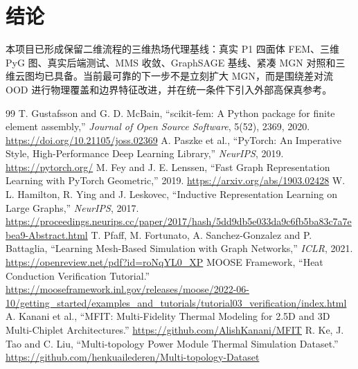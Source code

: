 \documentclass[11pt,a4paper]{article}
\begin{document}
\section{结论}
本项目已形成保留二维流程的三维热场代理基线：真实 P1 四面体 FEM、三维 PyG 图、真实后端测试、MMS 收敛、GraphSAGE 基线、紧凑 MGN 对照和三维云图均已具备。当前最可靠的下一步不是立刻扩大 MGN，而是围绕差对流 OOD 进行物理覆盖和边界特征改进，并在统一条件下引入外部高保真参考。

\begin{thebibliography}{99}
 T. Gustafsson and G. D. McBain, ``scikit-fem: A Python package for finite element assembly,'' \emph{Journal of Open Source Software}, 5(52), 2369, 2020. \url{https://doi.org/10.21105/joss.02369}
 A. Paszke et al., ``PyTorch: An Imperative Style, High-Performance Deep Learning Library,'' \emph{NeurIPS}, 2019. \url{https://pytorch.org/}
 M. Fey and J. E. Lenssen, ``Fast Graph Representation Learning with PyTorch Geometric,'' 2019. \url{https://arxiv.org/abs/1903.02428}
 W. L. Hamilton, R. Ying and J. Leskovec, ``Inductive Representation Learning on Large Graphs,'' \emph{NeurIPS}, 2017. \url{https://proceedings.neurips.cc/paper/2017/hash/5dd9db5e033da9c6fb5ba83c7a7ebea9-Abstract.html}
 T. Pfaff, M. Fortunato, A. Sanchez-Gonzalez and P. Battaglia, ``Learning Mesh-Based Simulation with Graph Networks,'' \emph{ICLR}, 2021. \url{https://openreview.net/pdf?id=roNqYL0_XP}
 MOOSE Framework, ``Heat Conduction Verification Tutorial.'' \url{https://mooseframework.inl.gov/releases/moose/2022-06-10/getting_started/examples_and_tutorials/tutorial03_verification/index.html}
 A. Kanani et al., ``MFIT: Multi-Fidelity Thermal Modeling for 2.5D and 3D Multi-Chiplet Architectures.'' \url{https://github.com/AlishKanani/MFIT}
 R. Ke, J. Tao and C. Liu, ``Multi-topology Power Module Thermal Simulation Dataset.'' \url{https://github.com/henkuailederen/Multi-topology-Dataset}
\end{thebibliography}
\end{document}
